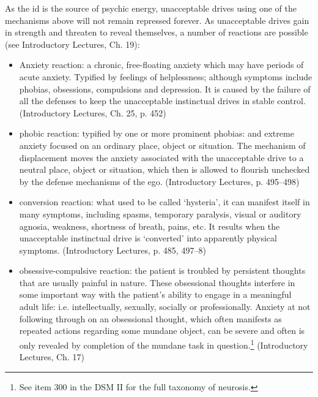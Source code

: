 As the id is the source of psychic energy, unacceptable drives using one of the mechanisms above will not remain repressed forever. As unacceptable drives gain in strength and threaten to reveal themselves, a number of reactions are possible (see Introductory Lectures, Ch. 19):

\begin{itemize}
\item Anxiety reaction: a chronic, free-floating anxiety which may have periods of acute anxiety. Typified by feelings of helplessness; although symptoms include phobias, obsessions, compulsions and depression. It is caused by the failure of all the defenses to keep the unacceptable instinctual drives in stable control. (Introductory Lectures, Ch. 25, p. 452)

\item phobic reaction: typified by one or more prominent phobias: and extreme anxiety focused on an ordinary place, object or situation. The mechanism of displacement moves the anxiety associated with the unacceptable drive to a neutral place, object or situation, which then is allowed to flourish unchecked by the defense mechanisms of the ego. (Introductory Lectures, p. 495--498)

\item conversion reaction: what used to be called `hysteria', it can manifest itself in many symptoms, including spasms, temporary paralysis, visual or auditory agnosia, weakness, shortness of breath, pains, etc. It results when the unacceptable instinctual drive is `converted' into apparently physical symptoms. (Introductory Lectures, p. 485, 497--8)

\item obsessive-compulsive reaction: the patient is troubled by persistent thoughts that are usually painful in nature. These obsessional thoughts interfere in some important way with the patient's ability to engage in a meaningful adult life: i.e. intellectually, sexually, socially or professionally. Anxiety at not following through on an obsessional thought, which often manifests as repeated actions regarding some mundane object, can be severe and often is only revealed by completion of the mundane task in question.\footnote{See item 300 in the DSM II for the full taxonomy of neurosis.} (Introductory Lectures, Ch. 17)

\end{itemize}

